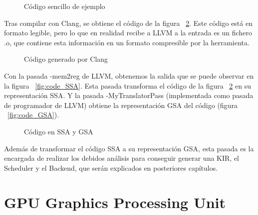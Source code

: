 \begin{figure}[tph]
\begin{center}
\caption{Código sencillo de ejemplo}
\label{fig:sample_code}
\end{center}
\end{figure}
%

Tras compilar con Clang, se obtiene el código de la figura ~\ref{fig:code_IR}. Este código está en formato legible, pero lo que en realidad recibe a LLVM a la entrada es un fichero .o, que contiene esta información en un formato compresible por la herramienta.

\begin{figure}[tph]
\begin{center}
\caption{Código generado por Clang}
\label{fig:code_IR}
\end{center}
\end{figure}
%

Con la pasada -mem2reg de LLVM, obtenemos la salida que se puede observar en la figura ~\ref{fig:code_SSA}. Esta pasada transforma el código de la figura ~\ref{fig:code_IR} en su representación SSA. Y la pasada -MyTranslatorPass (implementada como pasada de programador de LLVM) obtiene la representación GSA del código (figura ~\ref{fig:code_GSA}).

\begin{figure}[tph]
\begin{center}
%
\caption{Código en SSA y GSA}
\label{fig:SSA_GSA}
\end{center}
\end{figure}

Además de transformar el código SSA a su representación GSA, esta pasada es la encargada de realizar los debidos análisis para conseguir generar una KIR, el Scheduler y el Backend, que serán explicados en posteriores capítulos.

\section {GPU Graphics Processing Unit}
\label{capitulo3:gpu}

